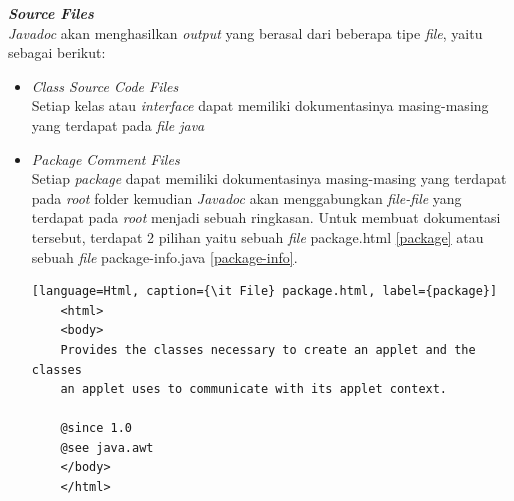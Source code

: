 \documentclass[a4paper,twoside]{article}
\begin{document}
\begin{enumerate}
\begin{enumerate}
\textbf{\textit{Source Files}}\\
{\it Javadoc} akan menghasilkan {\it output} yang berasal dari beberapa tipe {\it file}, yaitu sebagai berikut:
\begin{itemize}
	\item {\it Class Source Code Files}\\
	Setiap kelas atau {\it interface} dapat memiliki dokumentasinya masing-masing yang terdapat pada {\it file java}
	\item {\it Package Comment Files}\\
	Setiap {\it package} dapat memiliki dokumentasinya masing-masing yang terdapat pada {\it root} folder kemudian {\it Javadoc} akan menggabungkan {\it file-file} yang terdapat pada {\it root} menjadi sebuah ringkasan. Untuk membuat dokumentasi tersebut, terdapat 2 pilihan yaitu sebuah {\it file} package.html \ref{package} atau sebuah {\it file} package-info.java \ref{package-info}.
	\begin{lstlisting}[language=Html, caption={\it File} package.html, label={package}]
	<html>
	<body>
	Provides the classes necessary to create an applet and the classes
	an applet uses to communicate with its applet context.
	
	@since 1.0
	@see java.awt
	</body>
	</html>
	\end{lstlisting}
	

\end{itemize}
\end{enumerate}
\end{enumerate}
\end{document}
